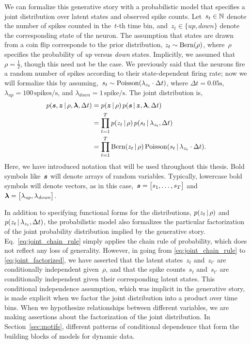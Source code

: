\sloppy We can formalize this generative story with a probabilistic
model that specifies a joint distribution over latent states and
observed spike counts. Let~$s_t \in \mathbb{N}$ denote the number of
spikes counted in the~$t$-th time bin,
and~$z_t \in \{\textit{up}, \textit{down}\}$ denote the corresponding
state of the neuron. The assumption that states are drawn from a coin
flip corresponds to the prior distribution,
${z_t \sim \mathrm{Bern}(\rho)}$, where~$\rho$ specifies the
probability of \textit{up} versus \textit{down} states.  Implicitly,
we assumed that~${\rho=\tfrac{1}{2}}$, though this need not be the
case.  We previously said that the neurons fire a random number of
spikes according to their state-dependent firing rate; now we will
formalize this by
assuming,~${s_{t} \sim \mathrm{Poisson}(\lambda_{z_t} \cdot \Delta t)}$,
where ${\Delta t = 0.05\text{s}}$,
${\lambda_{\textit{up}} = 100\,\text{spikes/s}}$, and
${\lambda_{\textit{down}} = 1\,\text{spike/s}}$. 
The joint distribution 
is,
\begin{align}
  \label{eq:joint_chain_rule}
  p(\boldsymbol{s}, \boldsymbol{z} \,|\, \rho, \boldsymbol{\lambda}, \Delta t) 
  &= p(\boldsymbol{z} \,|\, \rho) \, p(\boldsymbol{s} \,|\, \boldsymbol{z}, \boldsymbol{\lambda}, \Delta t) \\
  \label{eq:joint_factorized}
  &= \prod_{t=1}^T p(z_t \,|\, \rho) \, p(s_t \,|\, \lambda_{z_t}, \Delta t) \\
  &= \prod_{t=1}^T \mathrm{Bern}(z_t \,|\, \rho) \, \mathrm{Poisson}(s_t \,|\, \lambda_{z_t} \cdot \Delta t).
\end{align} 
Here, we have introduced notation that will be used throughout this
thesis. Bold symbols like~$\boldsymbol{s}$ will denote arrays of
random variables. Typically, lowercase bold symbols will denote
vectors, as in this case,~${\boldsymbol{s} = \big[s_1, \ldots, s_T \big]}$ 
and~${\boldsymbol{\lambda} = \big[ \lambda_{\textit{up}}, \lambda_{\textit{down}} \big]}$.

In addition to specifying functional forms for the distributions,
${p(z_t \,|\, \rho)}$ and~${p(z_t \,|\, \lambda_{z_t}, \Delta t)}$,
the probabilistic model also formalizes the particular factorization of
the joint probability distribution implied by the generative story.
Eq.~\ref{eq:joint_chain_rule} simply applies the chain rule of
probability, which does not reflect any loss of generality. However,
in going from \eqref{eq:joint_chain_rule} to
\eqref{eq:joint_factorized}, we have asserted that the latent
states~$z_t$ and~$z_{t'}$ are conditionally independent given~$\rho$,
and that the spike counts~$s_{t}$ and~$s_{t'}$ are conditionally
independent given their corresponding latent states. This conditional
independence assumption, which was implicit in the generative story,
is made explicit when we factor the joint distribution into a product
over time bins. When we hypothesize relationships between different variables,
we are making assertions about the factorization of the joint distribution. 
In Section~\ref{sec:motifs}, different patterns of conditional dependence 
that form the building blocks of models for dynamic data.

